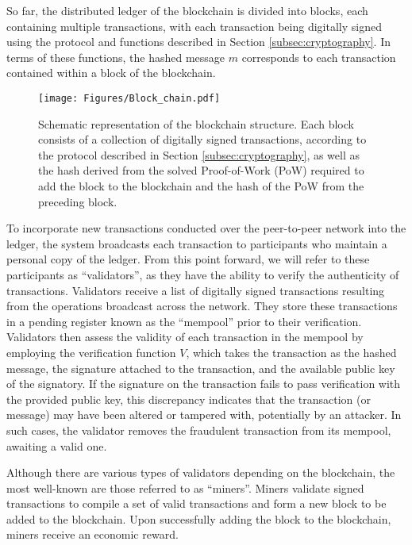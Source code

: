 \documentclass[nofootinbib,aps,prd,reprint,superscriptaddress,floatfix]{revtex4-2}
\begin{document}
So far, the distributed ledger of the blockchain is divided into blocks, each containing multiple transactions, with each transaction being digitally signed using the protocol and functions described in Section \ref{subsec:cryptography}. In terms of these functions, the hashed message $m$ corresponds to each transaction contained within a block of the blockchain.

\begin{figure*}[hbtp]
	\centering
        \texttt{[image: Figures/Block\_chain.pdf]}
        \caption{Schematic representation of the blockchain structure. Each block consists of a collection of digitally signed transactions, according to the protocol described in Section \ref{subsec:cryptography}, as well as the hash derived from the solved Proof-of-Work (PoW) required to add the block to the blockchain and the hash of the PoW from the preceding block.}
	\label{fig:Blockchain}
\end{figure*}

To incorporate new transactions conducted over the peer-to-peer network into the ledger, the system broadcasts each transaction to participants who maintain a personal copy of the ledger. From this point forward, we will refer to these participants as ``validators'', as they have the ability to verify the authenticity of transactions. Validators receive a list of digitally signed transactions resulting from the operations broadcast across the network. They store these transactions in a pending register known as the ``mempool'' prior to their verification. Validators then assess the validity of each transaction in the mempool by employing the verification function $V$, which takes the transaction as the hashed message, the signature attached to the transaction, and the available public key of the signatory. If the signature on the transaction fails to pass verification with the provided public key, this discrepancy indicates that the transaction (or message) may have been altered or tampered with, potentially by an attacker. In such cases, the validator removes the fraudulent transaction from its mempool, awaiting a valid one. 

Although there are various types of validators depending on the blockchain, the most well-known are those referred to as ``miners''. Miners validate signed transactions to compile a set of valid transactions and form a new block to be added to the blockchain. Upon successfully adding the block to the blockchain, miners receive an economic reward. 
\end{document}
